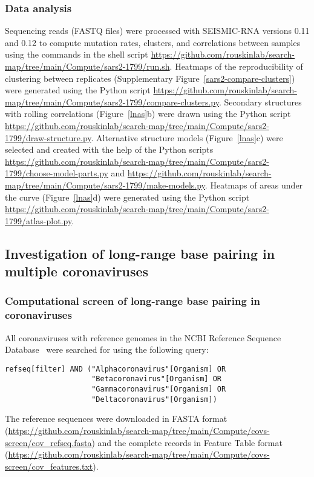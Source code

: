 \documentclass[main.tex]{subfiles}
\begin{document}
\subsubsection{Data analysis}

Sequencing reads (FASTQ files) were processed with SEISMIC-RNA versions 0.11 and 0.12 to compute mutation rates, clusters, and correlations between samples using the commands in the shell script \url{https://github.com/rouskinlab/search-map/tree/main/Compute/sars2-1799/run.sh}.
Heatmaps of the reproducibility of clustering between replicates (Supplementary Figure~\ref{sars2-compare-clusters}) were generated using the Python script \url{https://github.com/rouskinlab/search-map/tree/main/Compute/sars2-1799/compare-clusters.py}.
Secondary structures with rolling correlations (Figure~\ref{lnas}b) were drawn using the Python script \url{https://github.com/rouskinlab/search-map/tree/main/Compute/sars2-1799/draw-structure.py}.
Alternative structure models (Figure~\ref{lnas}c) were selected and created with the help of the Python scripts \url{https://github.com/rouskinlab/search-map/tree/main/Compute/sars2-1799/choose-model-parts.py} and \url{https://github.com/rouskinlab/search-map/tree/main/Compute/sars2-1799/make-models.py}.
Heatmaps of areas under the curve (Figure~\ref{lnas}d) were generated using the Python script \url{https://github.com/rouskinlab/search-map/tree/main/Compute/sars2-1799/atlas-plot.py}.


\subsection{Investigation of long-range base pairing in multiple coronaviruses}

\subsubsection{Computational screen of long-range base pairing in coronaviruses}
\label{screen_lri_comp}

All coronaviruses with reference genomes in the NCBI Reference Sequence Database~\cite{OLeary2016} were searched for using the following query:
\begin{verbatim}
refseq[filter] AND ("Alphacoronavirus"[Organism] OR
                    "Betacoronavirus"[Organism] OR
                    "Gammacoronavirus"[Organism] OR
                    "Deltacoronavirus"[Organism])
\end{verbatim}
The reference sequences were downloaded in FASTA format (\url{https://github.com/rouskinlab/search-map/tree/main/Compute/covs-screen/cov_refseq.fasta}) and the complete records in Feature Table format (\url{https://github.com/rouskinlab/search-map/tree/main/Compute/covs-screen/cov_features.txt}).
\end{document}

